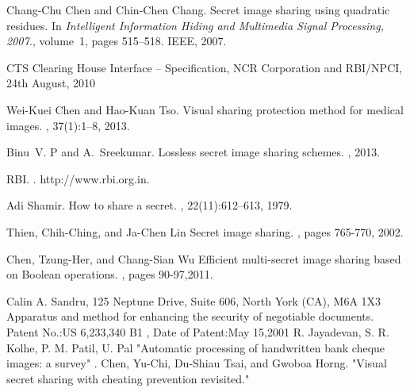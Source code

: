 
\begin{thebibliography}{00}


Chang-Chu Chen and Chin-Chen Chang.
\newblock Secret image sharing using quadratic residues.
\newblock In {\em Intelligent Information Hiding and Multimedia Signal Processing, 2007.}, volume~1, pages 515--518. IEEE, 2007.

\newblock CTS Clearing House Interface – Specification, NCR Corporation and RBI/NPCI, 24th August, 2010

Wei-Kuei Chen and Hao-Kuan Tso.
\newblock Visual sharing protection method for medical images.
, 37(1):1--8, 2013.

Binu~V. P and A.~Sreekumar.
\newblock Lossless secret image sharing schemes.
, 2013.

RBI.
.
\newblock http://www.rbi.org.in.

Adi Shamir.
\newblock How to share a secret.
, 22(11):612--613, 1979.

Thien, Chih-Ching, and Ja-Chen Lin 
\newblock Secret image sharing.
, 
pages 765-770, 2002.

Chen, Tzung-Her, and Chang-Sian Wu
\newblock Efficient multi-secret image sharing based on Boolean operations.
, 
pages 90-97,2011.

Calin A. Sandru, 125 Neptune Drive, Suite 606, North York (CA), M6A 1X3
\newblock Apparatus and method for enhancing the security of negotiable documents.
\newblock Patent No.:US 6,233,340 B1 , Date of Patent:May 15,2001
R. Jayadevan, S. R. Kolhe, P. M. Patil, U. Pal
\newblock "Automatic processing of handwritten bank cheque images:
a survey" 
.
Chen, Yu-Chi, Du-Shiau Tsai, and Gwoboa Horng. 
\newblock "Visual secret sharing with cheating prevention revisited." 

\end{thebibliography}